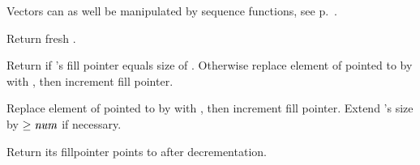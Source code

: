 Vectors can as well be manipulated by sequence functions, see p.\ \pageref{section:Sequences}.

\begin{LIST}{1cm}
  
   Return fresh .

  Return \retval{\NIL} if 's fill pointer equals size of
  . Otherwise
  replace element of  pointed to by  with
  , then increment fill pointer.

  Replace element of  pointed to by  with
  , then increment fill pointer. Extend 's size by
  $\ge \VAR{num}$ if necessary.

  Return  its fillpointer points to
  after decrementation.

\end{LIST}


